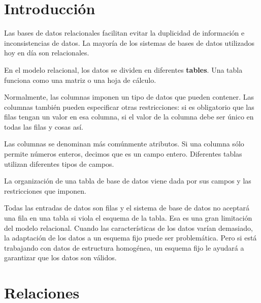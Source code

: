 \documentclass[12pt, fleqn]{report}                             %
\begin{document}
        \clearpage
        \section{Introducción}

        Las bases de datos relacionales facilitan evitar la duplicidad de información
        e inconsistencias de datos.
        La mayoría de los sistemas de bases de datos utilizados hoy en día son relacionales.

        En el modelo relacional, los datos se dividen en diferentes \textbf{tables}.
        Una tabla funciona como una matriz o una hoja de cálculo.

        Normalmente, las columnas imponen un tipo de datos que pueden contener.
        Las columnas también pueden especificar otras restricciones: si es obligatorio que las
        filas tengan un valor en esa columna, si el valor de la columna debe ser único en todas
        las filas y cosas así.

        Las columnas se denominan más comúnmente atributos.
        Si una columna sólo permite números enteros, decimos que es un campo entero.
        Diferentes tablas utilizan diferentes tipos de campos.

        La organización de una tabla de base de datos viene dada por sus campos y las
        restricciones que imponen.

        Todas las entradas de datos son filas y el sistema de base de datos no aceptará
        una fila en una tabla si viola el esquema de la tabla. Esa es una gran limitación
        del modelo relacional.
        Cuando las características de los datos varían demasiado, la adaptación de los datos
        a un esquema fijo puede ser problemática. Pero si está trabajando con datos de
        estructura homogénea, un esquema fijo le ayudará a garantizar que los datos son válidos.



        \clearpage
        \section{Relaciones}
\end{document}
